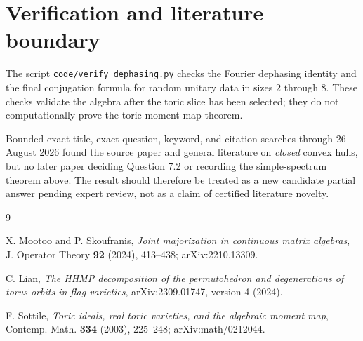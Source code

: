 \documentclass[11pt]{article}
\begin{document}
\section{Verification and literature boundary}

The script \texttt{code/verify\_dephasing.py} checks the Fourier dephasing
identity and the final conjugation formula for random unitary data in sizes
$2$ through $8$.  These checks validate the algebra after the toric slice has
been selected; they do not computationally prove the toric moment-map theorem.

Bounded exact-title, exact-question, keyword, and citation searches through
26 August 2026 found the source paper and general literature on \emph{closed}
convex hulls, but no later paper deciding Question 7.2 or recording the
simple-spectrum theorem above.  The result should therefore be treated as a
new candidate partial answer pending expert review, not as a claim of certified
literature novelty.

\begin{thebibliography}{9}

X. Mootoo and P. Skoufranis,
\emph{Joint majorization in continuous matrix algebras},
J. Operator Theory \textbf{92} (2024), 413--438;
arXiv:2210.13309.

C. Lian,
\emph{The HHMP decomposition of the permutohedron and degenerations of torus
orbits in flag varieties},
arXiv:2309.01747, version 4 (2024).

F. Sottile,
\emph{Toric ideals, real toric varieties, and the algebraic moment map},
Contemp. Math. \textbf{334} (2003), 225--248;
arXiv:math/0212044.

\end{thebibliography}
\end{document}
